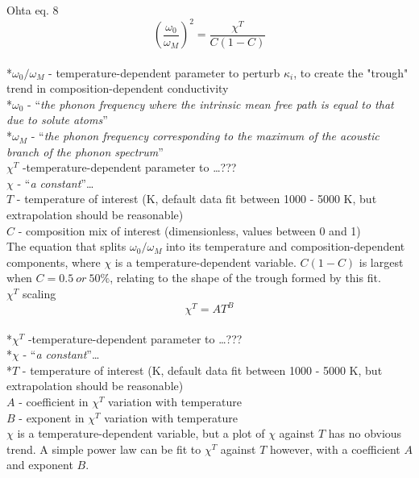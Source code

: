 Ohta eq. 8 
\begin{equation}%
\left ( \frac{\omega_{0}}{\omega_{M}} \right )^{2}=\frac{\chi^{T}}{C\left ( 1-C \right )}  
\label{eq.ohta8}
\end{equation}%
\\ *$\omega_{0}/\omega_{M}$ - temperature-dependent parameter to perturb $\kappa_{i}$, to create the "trough" trend in composition-dependent conductivity\\
*$\omega_{0}$ - \enquote{\textit{the phonon frequency where the intrinsic mean free path is equal to that due to solute atoms}}\\
*$\omega_{M}$ - \enquote{\textit{the phonon frequency corresponding to the maximum of the acoustic branch of the phonon spectrum}}\\
$\chi^{T}$ -temperature-dependent parameter to \dots ??? \\
$\chi$ - \enquote{\textit{a constant}}\dots\\
$T$ - temperature of interest (K, default data fit between 1000 - 5000 K, but extrapolation should be reasonable)\\                    
$C$ - composition mix of interest (dimensionless, values between 0 and 1)\\

The equation that splits $\omega_{0}/\omega_{M}$ into its temperature and composition-dependent components, where $\chi$ is a temperature-dependent variable. $C\left ( 1-C \right )$ is largest when $C=0.5\ or\ 50\%$, relating to the shape of the trough formed by this fit.\\

$\chi^{T}$ scaling 
\begin{equation}%
\chi^{T}=A T^{B}
\label{eq.chi_scale}
\end{equation}%
\\ *$\chi^{T}$ -temperature-dependent parameter to \dots ??? \\
*$\chi$ - \enquote{\textit{a constant}}\dots\\
*$T$ - temperature of interest (K, default data fit between 1000 - 5000 K, but extrapolation should be reasonable)\\                    
$A$ - coefficient in $\chi^{T}$ variation with temperature\\
$B$ - exponent in $\chi^{T}$ variation with temperature\\

$\chi$ is a temperature-dependent variable, but a plot of $\chi$ against $T$ has no obvious trend. A simple power law can be fit to $\chi^{T}$ against $T$ however, with a coefficient $A$ and exponent $B$.\\

